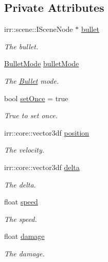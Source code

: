 \subsection*{Private Attributes}
\begin{DoxyCompactItemize}
\item 
irr\-::scene\-::\-I\-Scene\-Node $\ast$ \hyperlink{class_bullet_a1269c5dd9e8fde8489ecccb2b63a7675}{bullet}
\begin{DoxyCompactList}\small\item\em The bullet. \end{DoxyCompactList}\item 
\hyperlink{class_bullet_a5d75af562dbb5f6f4f68584ca9193aa5}{Bullet\-Mode} \hyperlink{class_bullet_a71410182ef75dfa9bffa3103e3115a5f}{bullet\-Mode}
\begin{DoxyCompactList}\small\item\em The \hyperlink{class_bullet}{Bullet} mode. \end{DoxyCompactList}\item 
bool \hyperlink{class_bullet_aeaf18e3b47ec51f973befce26e97bf48}{set\-Once} = true
\begin{DoxyCompactList}\small\item\em True to set once. \end{DoxyCompactList}\item 
irr\-::core\-::vector3df \hyperlink{class_bullet_a02649f79014e7fa879e619b0404ad22b}{position}
\begin{DoxyCompactList}\small\item\em The velocity. \end{DoxyCompactList}\item 
irr\-::core\-::vector3df \hyperlink{class_bullet_ab9e89b541c875e153a8ae09f1527913e}{delta}
\begin{DoxyCompactList}\small\item\em The delta. \end{DoxyCompactList}\item 
float \hyperlink{class_bullet_a5fbd5204eec00c8285686abeb4547f16}{speed}
\begin{DoxyCompactList}\small\item\em The speed. \end{DoxyCompactList}\item 
float \hyperlink{class_bullet_a1cad8c80e63d13da57b563b8e8e3f79e}{damage}
\begin{DoxyCompactList}\small\item\em The damage. \end{DoxyCompactList}\item 

\end{DoxyCompactItemize}
